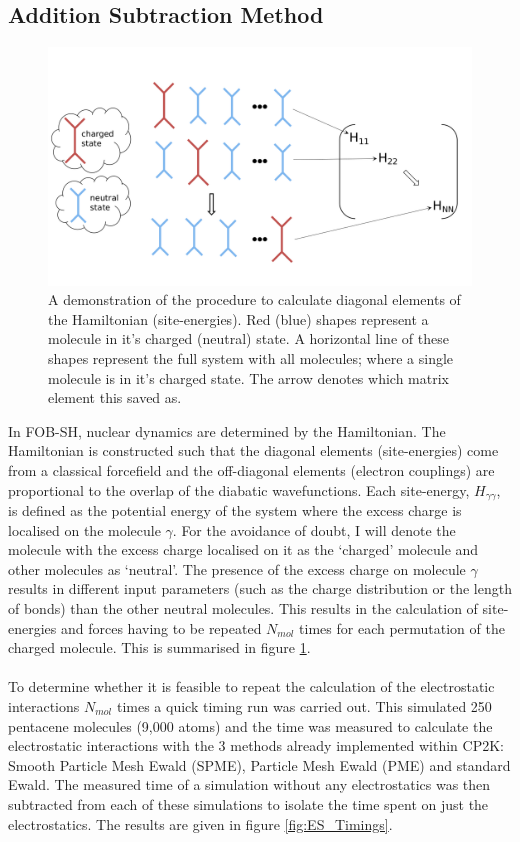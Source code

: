 \subsection{Addition Subtraction Method}
\label{sect:addSubMethod}
\begin{figure}[ht]
  \includegraphics[width=\textwidth]{./img/ES/ForceEnerCalc.png}
  \caption{\label{fig:FE_Calc}A demonstration of the procedure to calculate diagonal elements of the Hamiltonian (site-energies). Red (blue) shapes represent a molecule in it's charged (neutral) state. A  horizontal line of these shapes represent the full system with all molecules; where a single molecule is in it's charged state. The arrow denotes which matrix element this saved as.}
\end{figure}
\noindent In FOB-SH, nuclear dynamics are determined by the Hamiltonian. The Hamiltonian is constructed such that the diagonal elements (site-energies) come from a classical forcefield and the off-diagonal elements (electron couplings) are proportional to the overlap of the diabatic wavefunctions. Each site-energy, $H_{\gamma \gamma}$, is defined as the potential energy of the system where the excess charge is localised on the molecule $\gamma$. For the avoidance of doubt, I will denote the molecule with the excess charge localised on it as the `charged' molecule and other molecules as `neutral'. The presence of the excess charge on molecule $\gamma$ results in different input parameters (such as the charge distribution or the length of bonds) than the other neutral molecules. This results in the calculation of site-energies and forces having to be repeated $N_{mol}$ times for each permutation of the charged molecule. This is summarised in figure \ref{fig:FE_Calc}. 
\\\\
To determine whether it is feasible to repeat the calculation of the electrostatic interactions $N_{mol}$ times a quick timing run was carried out. This simulated 250 pentacene molecules (9,000 atoms) and the time was measured to calculate the electrostatic interactions with the 3 methods already implemented within CP2K: Smooth Particle Mesh Ewald (SPME), Particle Mesh Ewald (PME) and standard Ewald. The measured time of a simulation without any electrostatics was then subtracted from each of these simulations to isolate the time spent on just the electrostatics. The results are given in figure  \ref{fig:ES_Timings}.
